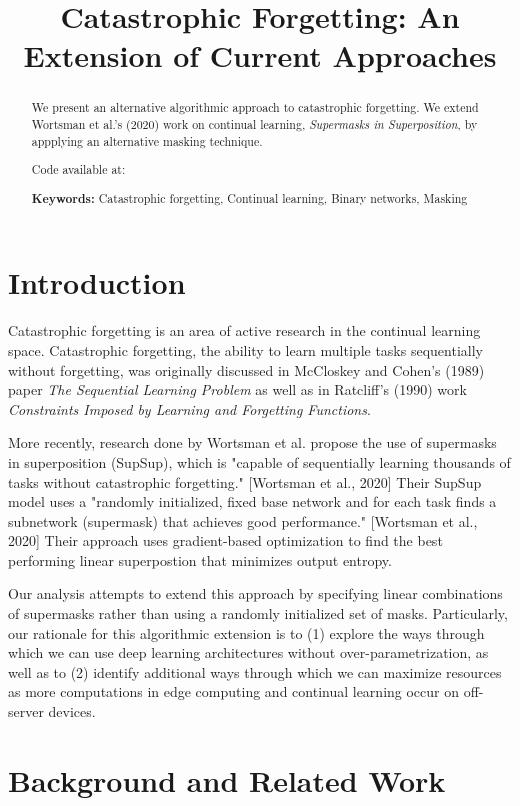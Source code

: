 \documentclass{article}
\title{Catastrophic Forgetting: An Extension of Current Approaches}
\begin{document}
\maketitle


\begin{abstract}
We present an alternative algorithmic approach to catastrophic forgetting. We extend Wortsman et al.'s (2020) work on continual learning, \emph{Supermasks in Superposition}, by appplying an alternative masking technique.


Code available at: 

\textbf{Keywords:} Catastrophic forgetting, Continual learning, Binary networks, Masking

\end{abstract}



\section{Introduction}
Catastrophic forgetting is an area of active research in the continual learning space. Catastrophic forgetting, the ability to learn multiple tasks sequentially without forgetting, was originally discussed in McCloskey and Cohen's (1989) paper \emph{The Sequential Learning Problem} as well as in Ratcliff's (1990) work \emph{Constraints Imposed by Learning and Forgetting Functions}. 

More recently, research done by Wortsman et al. propose the use of supermasks in superposition (SupSup), which is "capable of sequentially learning thousands of tasks without catastrophic forgetting." [Wortsman et al., 2020] Their SupSup model uses a "randomly initialized, fixed base network and for each task finds a subnetwork (supermask) that achieves good performance." [Wortsman et al., 2020] Their approach uses gradient-based optimization to find the best performing linear superpostion that minimizes output entropy. 

Our analysis attempts to extend this approach by specifying linear combinations of supermasks rather than using a randomly initialized set of masks. Particularly, our rationale for this algorithmic extension is to (1) explore the ways through which we can use deep learning architectures without over-parametrization, as well as to (2) identify additional ways through which we can maximize resources as more computations in edge computing and continual learning occur on off-server devices. 


\section{Background and Related Work}
\end{document}
